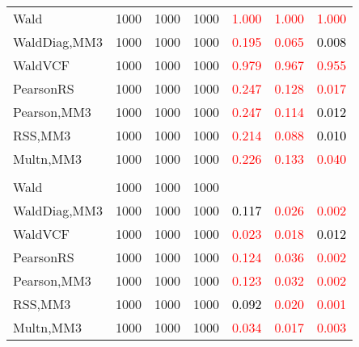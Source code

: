 \documentclass[
]{article}
\begin{document}
\begin{table}[H]
{\begin{tabular}[t]{lrrrrrr}
\hspace{1em}Wald & 1000 & 1000 & 1000 & \textcolor{red}{1.000} & \textcolor{red}{1.000} & \textcolor{red}{1.000}\\
\hspace{1em}WaldDiag,MM3 & 1000 & 1000 & 1000 & \textcolor{red}{0.195} & \textcolor{red}{0.065} & \textcolor{black}{0.008}\\
\hspace{1em}WaldVCF & 1000 & 1000 & 1000 & \textcolor{red}{0.979} & \textcolor{red}{0.967} & \textcolor{red}{0.955}\\
\hspace{1em}PearsonRS & 1000 & 1000 & 1000 & \textcolor{red}{0.247} & \textcolor{red}{0.128} & \textcolor{red}{0.017}\\
\hspace{1em}Pearson,MM3 & 1000 & 1000 & 1000 & \textcolor{red}{0.247} & \textcolor{red}{0.114} & \textcolor{black}{0.012}\\
\hspace{1em}RSS,MM3 & 1000 & 1000 & 1000 & \textcolor{red}{0.214} & \textcolor{red}{0.088} & \textcolor{black}{0.010}\\
\hspace{1em}Multn,MM3 & 1000 & 1000 & 1000 & \textcolor{red}{0.226} & \textcolor{red}{0.133} & \textcolor{red}{0.040}\\
\addlinespace[0.3em]
\multicolumn{7}{l}{\textbf{3F 15V}}\\
\hspace{1em}Wald & 1000 & 1000 & 1000 & \textcolor{black}{} & \textcolor{black}{} & \textcolor{black}{}\\
\hspace{1em}WaldDiag,MM3 & 1000 & 1000 & 1000 & \textcolor{black}{0.117} & \textcolor{red}{0.026} & \textcolor{red}{0.002}\\
\hspace{1em}WaldVCF & 1000 & 1000 & 1000 & \textcolor{red}{0.023} & \textcolor{red}{0.018} & \textcolor{black}{0.012}\\
\hspace{1em}PearsonRS & 1000 & 1000 & 1000 & \textcolor{red}{0.124} & \textcolor{red}{0.036} & \textcolor{red}{0.002}\\
\hspace{1em}Pearson,MM3 & 1000 & 1000 & 1000 & \textcolor{red}{0.123} & \textcolor{red}{0.032} & \textcolor{red}{0.002}\\
\hspace{1em}RSS,MM3 & 1000 & 1000 & 1000 & \textcolor{black}{0.092} & \textcolor{red}{0.020} & \textcolor{red}{0.001}\\
\hspace{1em}Multn,MM3 & 1000 & 1000 & 1000 & \textcolor{red}{0.034} & \textcolor{red}{0.017} & \textcolor{red}{0.003}\\
\bottomrule
\end{tabular}}
\endgroup{}
\end{table}
\end{document}
